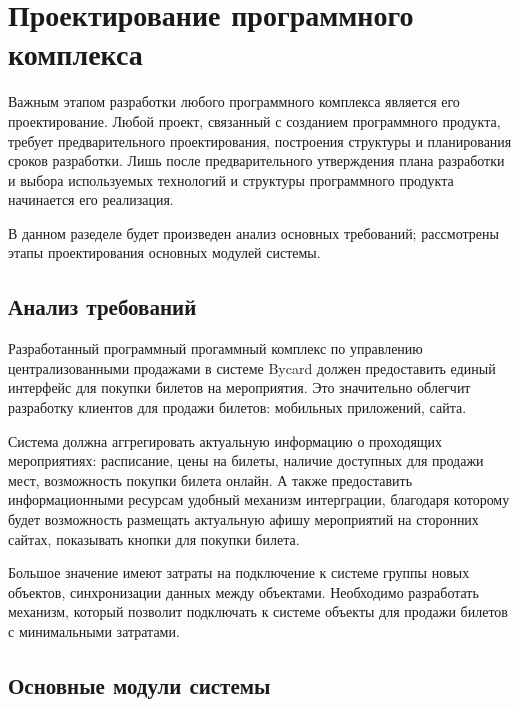 \section{Проектирование программного комплекса}

Важным этапом разработки любого программного комплекса является его проектирование. Любой проект, связанный с созданием программного продукта, требует предварительного проектирования, построения структуры и планирования сроков разработки. Лишь после предварительного утверждения плана разработки и выбора используемых технологий и структуры программного продукта начинается его реализация.

В данном разеделе будет произведен анализ основных требований; рассмотрены этапы проектирования основных модулей системы.

\subsection{Анализ требований}

Разработанный программный прогаммный комплекс по управлению централизованными продажами в системе Bycard должен предоставить единый интерфейс для покупки билетов на мероприятия. Это значительно облегчит разработку клиентов для продажи билетов: мобильных приложений, сайта.

Система должна аггрегировать актуальную информацию о проходящих мероприятиях: расписание, цены на билеты, наличие доступных для продажи мест, возможность покупки билета онлайн. А также предоставить информационными ресурсам удобный механизм интерграции, благодаря которому будет возможность размещать актуальную афишу мероприятий на сторонних сайтах, показывать кнопки для покупки билета.

Большое значение имеют затраты на подключение к системе группы новых объектов, синхронизации данных между объектами. Необходимо разработать механизм, который позволит подключать к системе объекты для продажи билетов с минимальными затратами.

\subsection{Основные модули системы}

\subsubsection{}


